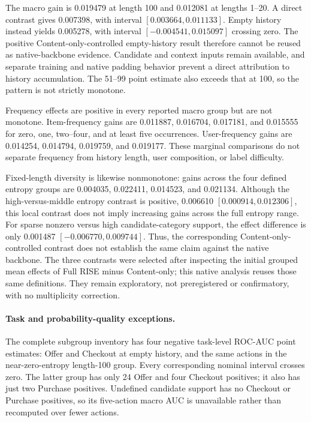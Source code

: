 The macro gain is 0.019479 at length 100 and 0.012081 at lengths 1--20.
A direct contrast gives 0.007398, with interval $[0.003664,0.011133]$.
Empty history instead yields 0.005278, with interval $[-0.004541,0.015097]$
crossing zero. The positive
Content-only-controlled empty-history result therefore cannot be reused as
native-backbone evidence. Candidate and context inputs remain available, and
separate training and native padding behavior prevent a direct attribution to
history accumulation. The 51--99 point estimate also exceeds that at 100,
so the pattern is not strictly monotone.

Frequency effects are positive in every reported macro group but are not
monotone. Item-frequency gains are 0.011887, 0.016704, 0.017181, and 0.015555
for zero, one, two--four, and at least five occurrences. User-frequency gains
are 0.014254, 0.014794, 0.019759, and 0.019177. These marginal comparisons do
not separate frequency from history length, user composition, or label difficulty.

Fixed-length diversity is likewise nonmonotone: gains across the four defined
entropy groups are 0.004035, 0.022411, 0.014523, and 0.021134. Although the
high-versus-middle entropy contrast is positive, 0.006610
$[0.000914,0.012306]$, this local contrast does not imply increasing gains across
the full entropy range. For sparse nonzero versus high candidate-category
support, the effect difference is only 0.001487 $[-0.006770,0.009744]$.
Thus, the corresponding Content-only-controlled contrast does not establish
the same claim against the native backbone. The three contrasts were selected
after inspecting the initial grouped mean effects of Full RISE minus
Content-only; this native analysis reuses those same definitions. They remain
exploratory, not preregistered or confirmatory, with no multiplicity correction.

\paragraph{Task and probability-quality exceptions.}
The complete subgroup inventory has four negative task-level ROC-AUC point
estimates: Offer and Checkout at empty history, and the same actions in the
near-zero-entropy length-100 group. Every corresponding nominal interval crosses
zero. The latter group has only 24 Offer and four Checkout positives; it also
has just two Purchase positives. Undefined candidate support has no Checkout
or Purchase positives, so its five-action macro AUC is unavailable rather than
recomputed over fewer actions.

